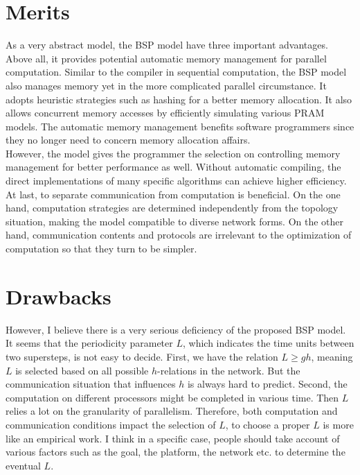 \documentclass[10pt, letterpaper]{article}
\begin{document}
\section{Merits}
\label{sec-merits}
As a very abstract model, the BSP model have three important advantages.
\\Above all, it provides potential automatic memory management for parallel computation. Similar to the compiler in sequential computation, the BSP model also manages memory yet in the more complicated parallel circumstance. It adopts heuristic strategies such as hashing for a better memory allocation. It also allows concurrent memory accesses by efficiently simulating various PRAM models. The automatic memory management benefits software programmers since they no longer need to concern memory allocation affairs.
\\However, the model gives the programmer the selection on controlling memory management for better performance as well. Without automatic compiling, the direct implementations of many specific algorithms can achieve higher efficiency.
\\At last, to separate communication from computation is beneficial. On the one hand, computation strategies are determined independently from the topology situation, making the model compatible to diverse network forms. On the other hand, communication contents and protocols are irrelevant to the optimization of computation so that they turn to be simpler.

\section{Drawbacks}
\label{sec-drawbacks}
However, I believe there is a very serious deficiency of the proposed BSP model. It seems that the periodicity parameter $L$, which indicates the time units between two supersteps, is not easy to decide. First, we have the relation $L \geq gh$, meaning $L$ is selected based on all possible $h$-relations in the network. But the communication situation that influences $h$ is always hard to predict. Second, the computation on different processors might be completed in various time. Then $L$ relies a lot on the granularity of parallelism. Therefore, both computation and communication conditions impact the selection of $L$, to choose a proper $L$ is more like an empirical work. I think in a specific case, people should take account of various factors such as the goal, the platform, the network etc. to determine the eventual $L$.
\end{document}
